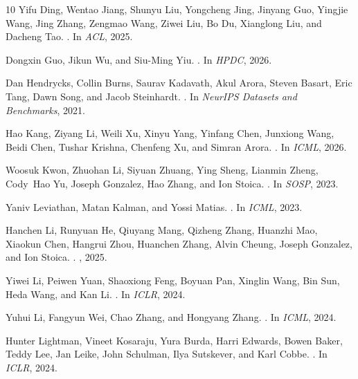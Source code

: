 \begin{thebibliography}{10}
Yifu Ding, Wentao Jiang, Shunyu Liu, Yongcheng Jing, Jinyang Guo, Yingjie
  Wang, Jing Zhang, Zengmao Wang, Ziwei Liu, Bo Du, Xianglong Liu, and
  Dacheng Tao.
.
\newblock In {\em ACL}, 2025.

Dongxin Guo, Jikun Wu, and Siu-Ming Yiu.
.
\newblock In {\em HPDC}, 2026.

Dan Hendrycks, Collin Burns, Saurav Kadavath, Akul Arora, Steven Basart, Eric
  Tang, Dawn Song, and Jacob Steinhardt.
.
\newblock In {\em NeurIPS Datasets and Benchmarks}, 2021.

Hao Kang, Ziyang Li, Weili Xu, Xinyu Yang, Yinfang Chen, Junxiong Wang, Beidi
  Chen, Tushar Krishna, Chenfeng Xu, and Simran Arora.
.
\newblock In {\em ICML}, 2026.

Woosuk Kwon, Zhuohan Li, Siyuan Zhuang, Ying Sheng, Lianmin Zheng, Cody~Hao Yu,
  Joseph Gonzalez, Hao Zhang, and Ion Stoica.
.
\newblock In {\em SOSP}, 2023.

Yaniv Leviathan, Matan Kalman, and Yossi Matias.
.
\newblock In {\em ICML}, 2023.

Hanchen Li, Runyuan He, Qiuyang Mang, Qizheng Zhang, Huanzhi Mao, Xiaokun Chen,
  Hangrui Zhou, Huanchen Zhang, Alvin Cheung, Joseph Gonzalez, and Ion Stoica.
.
, 2025.

Yiwei Li, Peiwen Yuan, Shaoxiong Feng, Boyuan Pan, Xinglin Wang, Bin Sun,
  Heda Wang, and Kan Li.
.
\newblock In {\em ICLR}, 2024.

Yuhui Li, Fangyun Wei, Chao Zhang, and Hongyang Zhang.
.
\newblock In {\em ICML}, 2024.

Hunter Lightman, Vineet Kosaraju, Yura Burda, Harri Edwards, Bowen Baker, Teddy
  Lee, Jan Leike, John Schulman, Ilya Sutskever, and Karl Cobbe.
.
\newblock In {\em ICLR}, 2024.


\end{thebibliography}
